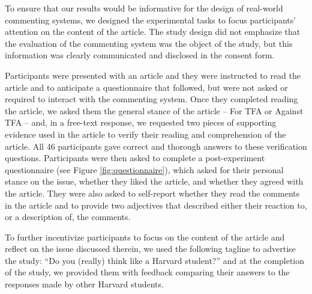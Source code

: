 To ensure that our results would be informative for the design of real-world commenting systems, we designed the experimental tasks to focus participants' attention on the content of the article.  The study design did not emphasize that the evaluation of the commenting system was the object of the study, but this information was clearly communicated and disclosed in the consent form. 

Participants were presented with an article and they were instructed to read the article and to anticipate a questionnaire that followed, but were not asked or required to interact with the commenting system.  Once they completed reading the article, we asked them the general stance of the article -- For TFA or Against TFA -- and, in a free-text response, we requested two pieces of supporting evidence used in the article to verify their reading and comprehension of the article. All 46 participants gave correct and thorough answers to these verification questions. Participants were then asked to complete a post-experiment questionnaire (see Figure \ref{fig:questionnaire}), which asked for their personal stance on the issue, whether they liked the article, and whether they agreed with the article. They were also asked to self-report whether they read the comments in the article and to provide two adjectives that described either their reaction to, or a description of, the comments.



To further incentivize participants to focus on the content of the article and reflect on the issue discussed therein, we used the following tagline to advertise the study: ``Do you (really) think like a Harvard student?'' and at the completion of the study, we provided them with feedback comparing their answers to the responses made by other Harvard students.

%

